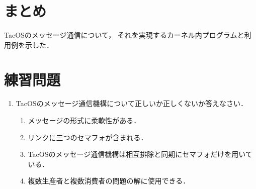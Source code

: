 \section{まとめ}
TacOSのメッセージ通信について，
それを実現するカーネル内プログラムと利用例を示した．

\section*{練習問題}
\begin{enumerate}
  \renewcommand{\labelenumi}{\ttfamily\arabic{chapter}.\arabic{enumi}}
  \setlength{\leftskip}{1em}
\item TacOSのメッセージ通信機構について正しいか正しくないか答えなさい．
  \begin{enumerate}
  \item メッセージの形式に柔軟性がある．
  \item リンクに三つのセマフォが含まれる．
  \item TacOSのメッセージ通信機構は相互排除と同期にセマフォだけを用いている．
  \item 複数生産者と複数消費者の問題の解に使用できる．
  \end{enumerate}
\end{enumerate}
